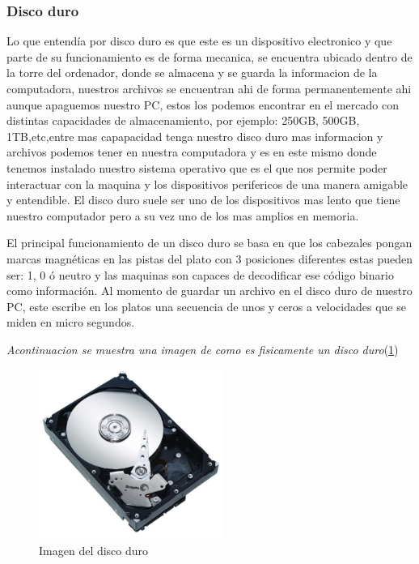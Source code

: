 \documentclass{article}
\begin{document}
\subsubsection{Disco duro}
Lo que entendía por disco duro es que este es un dispositivo electronico y que parte de su funcionamiento es de forma mecanica, se encuentra ubicado dentro de la torre del ordenador, donde se almacena y se guarda la informacion de la computadora, nuestros archivos se encuentran ahi de forma permanentemente ahi aunque apaguemos nuestro PC, estos los podemos encontrar en el mercado con distintas capacidades de almacenamiento, por ejemplo: 250GB, 500GB, 1TB,etc,entre mas capapacidad tenga nuestro disco duro mas informacion y archivos podemos tener en nuestra computadora y es en este mismo donde tenemos instalado nuestro sistema operativo que es el que nos permite poder interactuar con la maquina y los dispositivos perifericos de una manera amigable y entendible. El disco duro suele ser uno de los dispositivos mas lento que tiene nuestro computador pero a su vez uno de los mas amplios en memoria. 

\vspace{0.2cm}

El principal funcionamiento de un disco duro se basa en que los cabezales pongan marcas magnéticas en las pistas del plato con 3 posiciones diferentes estas pueden ser: 1, 0 ó neutro y las maquinas son capaces de decodificar ese código binario como información. Al momento de guardar un archivo en el disco duro de nuestro PC, este escribe en los platos una secuencia de unos y ceros a velocidades que se miden en micro segundos. \cite{qloudea}
\vspace{0.2cm}

\emph{Acontinuacion se muestra una imagen de como es fisicamente un disco duro}(\ref{fig:disco_duro})

\begin{figure}[h]
\includegraphics[width=6cm]{disco_duro.jpg}
\centering
\caption{Imagen del disco duro}
\label{fig:disco_duro}
\end{figure}
\end{document}
